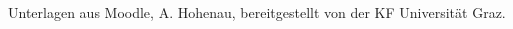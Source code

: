 \documentclass{article}
\begin{document}
%


%


\begin{thebibliography}{9}
 Unterlagen aus Moodle, A. Hohenau, bereitgestellt von der KF Universität Graz.
\end{thebibliography}
\end{document}
